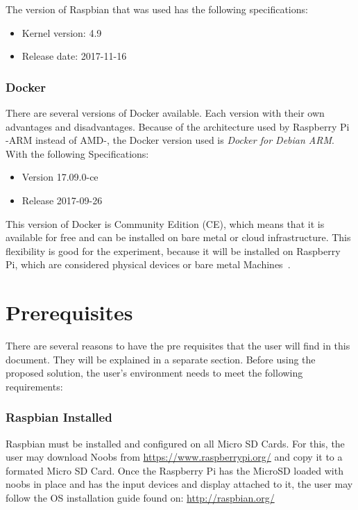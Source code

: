 The version of Raspbian that was used has the following specifications:
	
\begin{itemize}
	\item 	Kernel version: 4.9
	\item 	Release date: 2017-11-16
\end{itemize}
	
\subsubsection{Docker}

There are several versions of Docker available. Each version with
their own advantages and disadvantages. Because of the architecture
used by Raspberry Pi -ARM instead of AMD-, the Docker version used is
\textit{Docker for Debian ARM}. With the following
Specifications:
	
\begin{itemize}
	\item Version 17.09.0-ce
	\item Release 2017-09-26
\end{itemize}
	
This version of Docker is Community Edition (CE), which means that it
is available for free and can be installed on bare metal or cloud
infrastructure. This flexibility is good for the experiment, because
it will be installed on Raspberry Pi, which are considered physical
devices or bare metal Machines~\cite{dockerdoc2017}.
	
\section{Prerequisites}
	
There are several reasons to have the pre requisites that the user
will find in this document. They will be explained in a separate
section. Before using the proposed solution, the user’s environment
needs to meet the following requirements:
	
\subsubsection{Raspbian Installed}

Raspbian must be installed and configured on all Micro SD Cards.  For
this, the user may download Noobs from
\url{https://www.raspberrypi.org/} and copy it to a
formated Micro SD Card.  Once the Raspberry Pi has the MicroSD loaded
with noobs in place and has the input devices and display attached to
it, the user may follow the OS installation guide found on:
\url{http://raspbian.org/}
	

